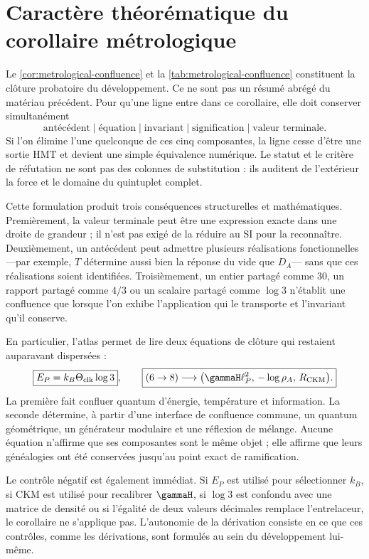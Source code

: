 \section{Caractère théorématique du corollaire métrologique}

Le \cref{cor:metrological-confluence} et la
\cref{tab:metrological-confluence} constituent la clôture probatoire du
développement. Ce ne sont pas un résumé abrégé du matériau précédent. Pour qu'une ligne
entre dans ce corollaire, elle doit conserver simultanément
\[
\text{antécédent}\mid\text{équation}\mid\text{invariant}
\mid\text{signification}\mid\text{valeur terminale}.
\]
Si l'on élimine l'une quelconque de ces cinq composantes, la ligne cesse d'être une
sortie HMT et devient une simple équivalence numérique. Le statut et
le critère de réfutation ne sont pas des colonnes de substitution : ils auditent de l'extérieur la force et le
domaine du quintuplet complet.

Cette formulation produit trois conséquences structurelles et mathématiques.
Premièrement, la valeur terminale peut être une expression exacte dans une droite de
grandeur ; il n'est pas exigé de la réduire au SI pour la reconnaître. Deuxièmement, un antécédent
peut admettre plusieurs réalisations fonctionnelles ---par exemple, \(T\)
détermine aussi bien la réponse du vide que \(D_A\)--- sans que ces
réalisations soient identifiées.
Troisièmement, un entier partagé comme \(30\), un rapport partagé comme \(4/3\)
ou un scalaire partagé comme \(\log3\) n'établit une confluence que lorsque l'on
exhibe l'application qui le transporte et l'invariant qu'il conserve.

En particulier, l'atlas permet de lire deux équations de clôture qui
restaient auparavant dispersées :
\begin{equation}
\boxed{E_P=k_B\Theta_{\rm clk}\log3},
\qquad
\boxed{
(6\to8)\longrightarrow
\bigl(\gammaH\ell_P^2,\,-\log\rho_A,\,R_{\rm CKM}\bigr).}
\label{eq:status-two-confluences}
\end{equation}
La première fait confluer quantum d'énergie, température et information. La
seconde détermine, à partir d'une interface de confluence commune, un quantum
géométrique, un générateur
modulaire et une réflexion de mélange. Aucune équation n'affirme que ses
composantes sont le même objet ; elle affirme que leurs généalogies ont été
conservées jusqu'au point exact de ramification.

Le contrôle négatif est également immédiat. Si \(E_P\) est utilisé pour sélectionner
\(k_B\), si CKM est utilisé pour recalibrer \(\gammaH\), si \(\log3\) est confondu
avec une matrice de densité ou si l'égalité de deux valeurs décimales remplace
l'entrelaceur, le corollaire ne s'applique pas. L'autonomie de la dérivation consiste en
ce que ces contrôles, comme les dérivations, sont formulés au sein
du développement lui-même.

